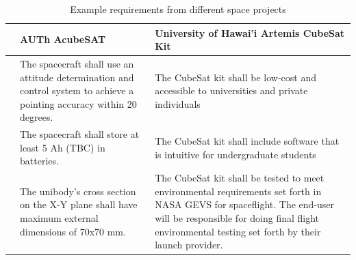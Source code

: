 \documentclass[a4paper,nobib,justified,final]{tufte-book}
\begin{document}
\begin{table}
	\def\arraystretch{1.4}
	\begin{tabularx}{\linewidth}{@{}lXX@{}}
		\toprule
		& AUTh AcubeSAT \cite{retselisAcubeSATTSVCD2020} & University of Hawai'i Artemis CubeSat Kit \cite{zhu23Requirements} \\ \midrule
		& The spacecraft shall use an attitude determination and control system to achieve a pointing accuracy within 20 degrees. & The CubeSat kit shall be low-cost and accessible to universities and private individuals \\
		& The spacecraft shall store at least 5 Ah (\acs{TBC}) in batteries. & The CubeSat kit shall include software that is intuitive for undergraduate students \\
		& The unibody's cross section on the X-Y plane shall have maximum external dimensions of 70x70 mm. & The CubeSat kit shall be tested to meet environmental requirements set forth in NASA GEVS for spaceflight. The end-user will be responsible for doing final flight environmental testing set forth by their launch provider. \\ \bottomrule
	\end{tabularx}
	\caption{Example requirements from different space projects}
	\label{tab:m_example_requirement_different}
\end{table}
\end{document}
